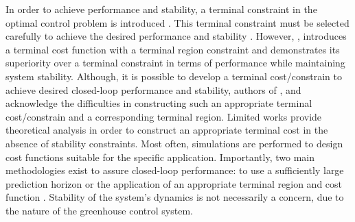  In order to achieve performance and stability, a terminal constraint in the optimal control problem is introduced \cite{amritEconomicOptimizationUsing2011}. This terminal constraint must be selected carefully to achieve the desired performance and stability \cite{rawlingsFundamentalsEconomicModel2012}. However, \cite{amritEconomicOptimizationUsing2011}, introduces a terminal cost function with a terminal region constraint and demonstrates its superiority over a terminal constraint in terms of performance while maintaining system stability. Although, it is possible to develop a terminal cost/constrain to achieve desired closed-loop performance and stability, authors of \cite{rawlingsFundamentalsEconomicModel2012}, \cite{amritEconomicOptimizationUsing2011} and \cite{ellisTutorialReviewEconomic2014} acknowledge the difficulties in constructing such an appropriate terminal cost/constrain and a corresponding terminal region. Limited works provide theoretical analysis in order to construct an appropriate terminal cost in the absence of stability constraints. Most often, simulations are performed to design cost functions suitable for the specific application. Importantly, two main methodologies exist to assure closed-loop performance: to use a sufficiently large prediction horizon or the application of an appropriate terminal region and cost function \cite{ellisTutorialReviewEconomic2014}. Stability of the system's dynamics is not necessarily a concern, due to the nature of the greenhouse control system.



